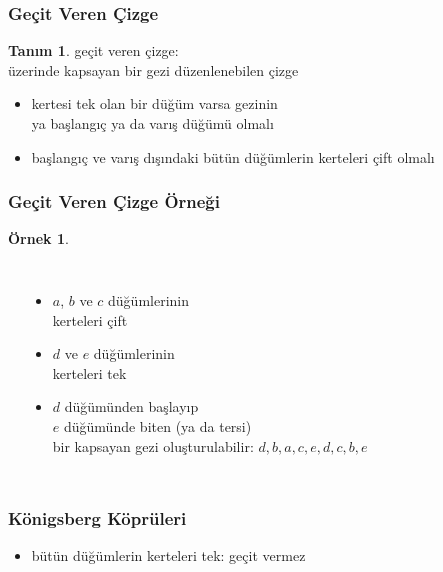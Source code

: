 \documentclass[dvipsnames]{beamer}
\theoremstyle{definition}
\newtheorem{tanim}[theorem]{Tanım}
\theoremstyle{example}
\newtheorem{ornek}[theorem]{Örnek}
\theoremstyle{plain}
\begin{document}
\begin{frame}
  \frametitle{Geçit Veren Çizge}

  \begin{tanim}
    \alert{geçit veren çizge}:\\
    üzerinde kapsayan bir gezi düzenlenebilen çizge
  \end{tanim}

  \begin{itemize}
    \pause
    \item kertesi tek olan bir düğüm varsa gezinin\\
      ya başlangıç ya da varış düğümü olmalı

    \pause
    \item başlangıç ve varış dışındaki bütün düğümlerin kerteleri çift olmalı
  \end{itemize}
\end{frame}

\begin{frame}
  \frametitle{Geçit Veren Çizge Örneği}

  \begin{ornek}
    \begin{columns}
      \begin{center}
      \end{center}

      \pause
      \begin{itemize}
        \item $a$, $b$ ve $c$ düğümlerinin\\
          kerteleri çift
        \item $d$ ve $e$ düğümlerinin\\
          kerteleri tek
        \pause
        \item $d$ düğümünden başlayıp\\
          $e$ düğümünde biten (ya da tersi)\\
          bir kapsayan gezi oluşturulabilir: $d,b,a,c,e,d,c,b,e$
      \end{itemize}
    \end{columns}
  \end{ornek}
\end{frame}

\begin{frame}
  \frametitle{Königsberg Köprüleri}

  \begin{center}
  \end{center}

  \pause
  \begin{itemize}
    \item bütün düğümlerin kerteleri tek: geçit vermez
  \end{itemize}
\end{frame}
\end{document}
